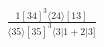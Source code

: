 \documentclass[varwidth, border=5pt]{standalone}
\begin{document}
\begin{my}
$\begin{gathered}
\scriptscriptstyle\frac{1[34]^3⟨24⟩[13]}{⟨35⟩[35]^3⟨3|1+2|3]}
\end{gathered}$
\end{my}
\end{document}
